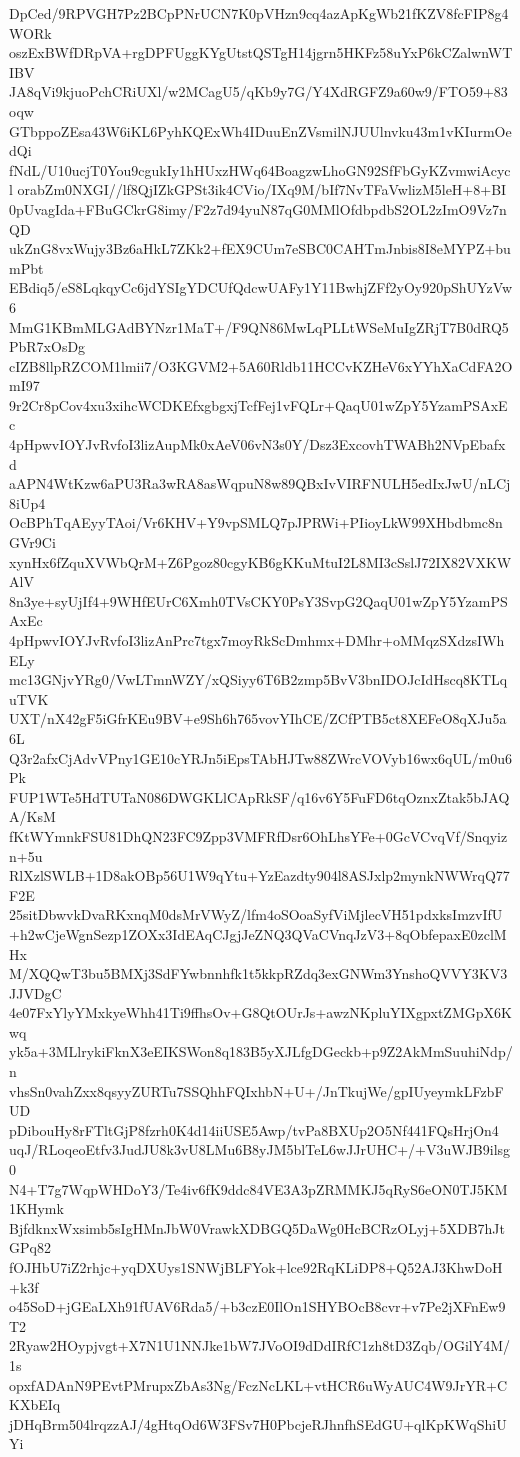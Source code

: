 DpCed/9RPVGH7Pz2BCpPNrUCN7K0pVHzn9cq4azApKgWb21fKZV8fcFIP8g4WORk
oszExBWfDRpVA+rgDPFUggKYgUtstQSTgH14jgrn5HKFz58uYxP6kCZalwnWTIBV
JA8qVi9kjuoPchCRiUXl/w2MCagU5/qKb9y7G/Y4XdRGFZ9a60w9/FTO59+83oqw
GTbppoZEsa43W6iKL6PyhKQExWh4IDuuEnZVsmilNJUUlnvku43m1vKIurmOedQi
fNdL/U10ucjT0You9cgukIy1hHUxzHWq64BoagzwLhoGN92SfFbGyKZvmwiAcycl
orabZm0NXGI//lf8QjIZkGPSt3ik4CVio/IXq9M/bIf7NvTFaVwlizM5leH+8+BI
0pUvagIda+FBuGCkrG8imy/F2z7d94yuN87qG0MMlOfdbpdbS2OL2zImO9Vz7nQD
ukZnG8vxWujy3Bz6aHkL7ZKk2+fEX9CUm7eSBC0CAHTmJnbis8I8eMYPZ+bumPbt
EBdiq5/eS8LqkqyCc6jdYSIgYDCUfQdcwUAFy1Y11BwhjZFf2yOy920pShUYzVw6
MmG1KBmMLGAdBYNzr1MaT+/F9QN86MwLqPLLtWSeMuIgZRjT7B0dRQ5PbR7xOsDg
cIZB8llpRZCOM1lmii7/O3KGVM2+5A60Rldb11HCCvKZHeV6xYYhXaCdFA2OmI97
9r2Cr8pCov4xu3xihcWCDKEfxgbgxjTcfFej1vFQLr+QaqU01wZpY5YzamPSAxEc
4pHpwvIOYJvRvfoI3lizAupMk0xAeV06vN3s0Y/Dsz3ExcovhTWABh2NVpEbafxd
aAPN4WtKzw6aPU3Ra3wRA8asWqpuN8w89QBxIvVIRFNULH5edIxJwU/nLCj8iUp4
OcBPhTqAEyyTAoi/Vr6KHV+Y9vpSMLQ7pJPRWi+PIioyLkW99XHbdbmc8nGVr9Ci
xynHx6fZquXVWbQrM+Z6Pgoz80cgyKB6gKKuMtuI2L8MI3cSslJ72IX82VXKWAlV
8n3ye+syUjIf4+9WHfEUrC6Xmh0TVsCKY0PsY3SvpG2QaqU01wZpY5YzamPSAxEc
4pHpwvIOYJvRvfoI3lizAnPrc7tgx7moyRkScDmhmx+DMhr+oMMqzSXdzsIWhELy
mc13GNjvYRg0/VwLTmnWZY/xQSiyy6T6B2zmp5BvV3bnIDOJcIdHscq8KTLquTVK
UXT/nX42gF5iGfrKEu9BV+e9Sh6h765vovYIhCE/ZCfPTB5ct8XEFeO8qXJu5a6L
Q3r2afxCjAdvVPny1GE10cYRJn5iEpsTAbHJTw88ZWrcVOVyb16wx6qUL/m0u6Pk
FUP1WTe5HdTUTaN086DWGKLlCApRkSF/q16v6Y5FuFD6tqOznxZtak5bJAQA/KsM
fKtWYmnkFSU81DhQN23FC9Zpp3VMFRfDsr6OhLhsYFe+0GcVCvqVf/Snqyizn+5u
RlXzlSWLB+1D8akOBp56U1W9qYtu+YzEazdty904l8ASJxlp2mynkNWWrqQ77F2E
25sitDbwvkDvaRKxnqM0dsMrVWyZ/lfm4oSOoaSyfViMjlecVH51pdxksImzvIfU
+h2wCjeWgnSezp1ZOXx3IdEAqCJgjJeZNQ3QVaCVnqJzV3+8qObfepaxE0zclMHx
M/XQQwT3bu5BMXj3SdFYwbnnhfk1t5kkpRZdq3exGNWm3YnshoQVVY3KV3JJVDgC
4e07FxYlyYMxkyeWhh41Ti9ffhsOv+G8QtOUrJs+awzNKpluYIXgpxtZMGpX6Kwq
yk5a+3MLlrykiFknX3eEIKSWon8q183B5yXJLfgDGeckb+p9Z2AkMmSuuhiNdp/n
vhsSn0vahZxx8qsyyZURTu7SSQhhFQIxhbN+U+/JnTkujWe/gpIUyeymkLFzbFUD
pDibouHy8rFTltGjP8fzrh0K4d14iiUSE5Awp/tvPa8BXUp2O5Nf441FQsHrjOn4
uqJ/RLoqeoEtfv3JudJU8k3vU8LMu6B8yJM5blTeL6wJJrUHC+/+V3uWJB9ilsg0
N4+T7g7WqpWHDoY3/Te4iv6fK9ddc84VE3A3pZRMMKJ5qRyS6eON0TJ5KM1KHymk
BjfdknxWxsimb5sIgHMnJbW0VrawkXDBGQ5DaWg0HcBCRzOLyj+5XDB7hJtGPq82
fOJHbU7iZ2rhjc+yqDXUys1SNWjBLFYok+lce92RqKLiDP8+Q52AJ3KhwDoH+k3f
o45SoD+jGEaLXh91fUAV6Rda5/+b3czE0IlOn1SHYBOcB8cvr+v7Pe2jXFnEw9T2
2Ryaw2HOypjvgt+X7N1U1NNJke1bW7JVoOI9dDdIRfC1zh8tD3Zqb/OGilY4M/1s
opxfADAnN9PEvtPMrupxZbAs3Ng/FczNcLKL+vtHCR6uWyAUC4W9JrYR+CKXbEIq
jDHqBrm504lrqzzAJ/4gHtqOd6W3FSv7H0PbcjeRJhnfhSEdGU+qlKpKWqShiUYi

